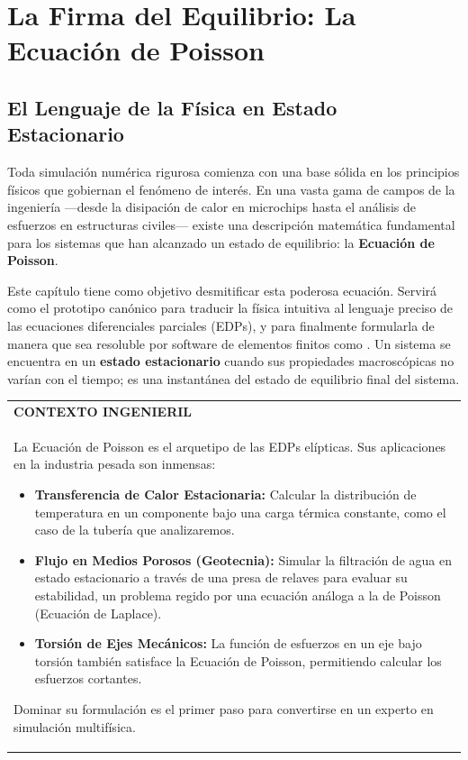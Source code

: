 \chapter{La Firma del Equilibrio: La Ecuación de Poisson}
\label{chap:poisson}

\section{El Lenguaje de la Física en Estado Estacionario}
\label{sec:poisson-intro}

Toda simulación numérica rigurosa comienza con una base sólida en los principios físicos que gobiernan el fenómeno de interés. En una vasta gama de campos de la ingeniería ---desde la disipación de calor en microchips hasta el análisis de esfuerzos en estructuras civiles--- existe una descripción matemática fundamental para los sistemas que han alcanzado un estado de equilibrio: la \textbf{Ecuación de Poisson}.

Este capítulo tiene como objetivo desmitificar esta poderosa ecuación. Servirá como el prototipo canónico para traducir la física intuitiva al lenguaje preciso de las ecuaciones diferenciales parciales (EDPs), y para finalmente formularla de manera que sea resoluble por software de elementos finitos como \fenics. Un sistema se encuentra en un \textbf{estado estacionario} cuando sus propiedades macroscópicas no varían con el tiempo; es una instantánea del estado de equilibrio final del sistema.

\begin{center}
\begin{tabular}{|p{}|}
\hline
\textbf{CONTEXTO INGENIERIL} \\
La Ecuación de Poisson es el arquetipo de las EDPs elípticas. Sus aplicaciones en la industria pesada son inmensas:
\begin{itemize}
    \item \textbf{Transferencia de Calor Estacionaria:} Calcular la distribución de temperatura en un componente bajo una carga térmica constante, como el caso de la tubería que analizaremos.
    \item \textbf{Flujo en Medios Porosos (Geotecnia):} Simular la filtración de agua en estado estacionario a través de una presa de relaves para evaluar su estabilidad, un problema regido por una ecuación análoga a la de Poisson (Ecuación de Laplace).
    \item \textbf{Torsión de Ejes Mecánicos:} La función de esfuerzos en un eje bajo torsión también satisface la Ecuación de Poisson, permitiendo calcular los esfuerzos cortantes.
\end{itemize}
Dominar su formulación es el primer paso para convertirse en un experto en simulación multifísica. \\
\hline
\end{tabular}
\end{center}

